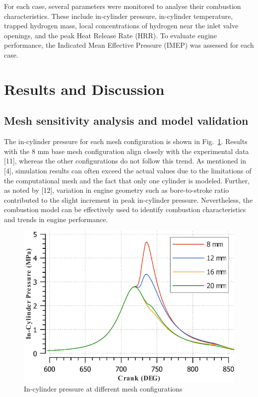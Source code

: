 \documentclass[conference]{IEEEtran}
\begin{document}
For each case, several parameters were monitored to analyse their combustion characteristics. 
These include in-cylinder pressure, in-cylinder temperature, trapped hydrogen mass, local concentrations of hydrogen near the inlet valve openings, and the peak Heat Release Rate (HRR). 
To evaluate engine performance, the Indicated Mean Effective Pressure (IMEP) was assessed for each case.


\section{Results and Discussion}
\subsection{Mesh sensitivity analysis and model validation}

The in-cylinder pressure for each mesh configuration is shown in Fig.~\ref{plt_1}. 
Results with the 8 mm base mesh configuration align closely with the experimental data [11], whereas the other configurations do not follow this trend. 
As mentioned in [4], simulation results can often exceed the actual values due to the limitations of the computational mesh and the fact that only one cylinder is modeled. 
Further, as noted by [12], variation in engine geometry such as bore-to-stroke ratio contributed to the slight increment in peak in-cylinder pressure. 
Nevertheless, the combustion model can be effectively used to identify combustion characteristics and trends in engine performance. 

\begin{figure}[htbp]
    \centerline{\includegraphics{plots and graphs/1.png}}
    \caption{In-cylinder pressure at different mesh configurations}
    \label{plt_1}
    \end{figure}
\end{document}
